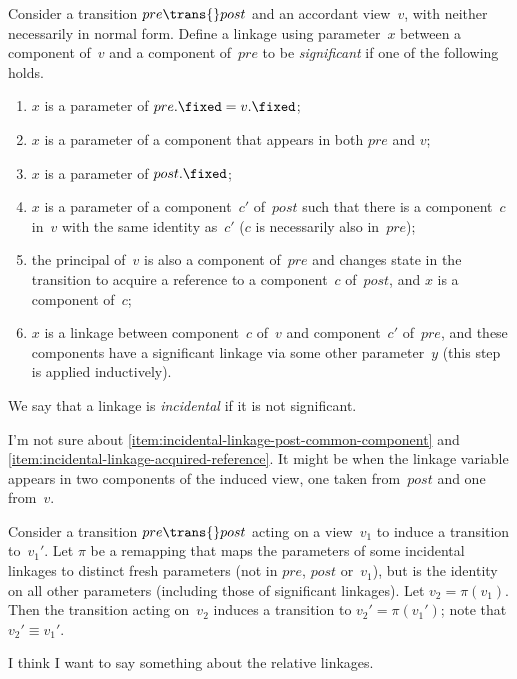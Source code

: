 \begin{definition}
\label{def:incidental-linkage}
Consider a transition $pre \trans{} post$ and an accordant view~$v$, with
neither necessarily in normal form.  Define a linkage using parameter~$x$
between a component of~$v$ and a component of~$pre$ to be \emph{significant}
if one of the following holds.
%
\begin{enumerate}
\item \label{item:incidental-linkage-fixed}
$x$ is a parameter of $pre.\fixed = v.\fixed$;

\item \label{item:incidental-linkage-common-component}
$x$ is a parameter of a component that appears in both $pre$ and $v$;

\item \label{item:incidental-linkage-post-fixed} $x$ is a parameter of
  $post.\fixed$;

\item \label{item:incidental-linkage-post-common-component} $x$ is a parameter
  of a component~$c'$ of~$post$ such that there is a component~$c$ in~$v$ with
  the same identity as~$c'$ ($c$ is necessarily also in~$pre$);

\item \label{item:incidental-linkage-acquired-reference} the principal of~$v$
  is also a component of~$pre$ and changes state in the transition to acquire
  a reference to a component~$c$ of~$post$, and $x$ is a component of~$c$;

\item $x$ is a linkage between component~$c$ of~$v$ and component~$c'$
  of~$pre$, and these components have a significant linkage via some other
  parameter~$y$ (this step is applied inductively).
\end{enumerate}
%
We say that a linkage is \emph{incidental} if it is not significant.
\end{definition}


I'm not sure about \ref{item:incidental-linkage-post-common-component} and
\ref{item:incidental-linkage-acquired-reference}.  It might be when the
linkage variable appears in two components of the induced view, one taken
from~$post$ and one from~$v$.


\begin{lemma}
Consider a transition $pre \trans{} post$ acting on a view~$v_1$ to induce a
transition to~$v_1'$.  Let $\pi$ be a remapping that maps the parameters of
some incidental linkages to distinct fresh parameters (not in $pre$, $post$
or~$v_1$), but is the identity on all other parameters (including those of
significant linkages).  Let $v_2 = \pi(v_1)$.  Then the transition acting
on~$v_2$ induces a transition to $v_2' = \pi(v_1')$; note that $v_2' \equiv
v_1'$.

\framebox{***} I think I want to say something about the relative linkages.
\end{lemma}


